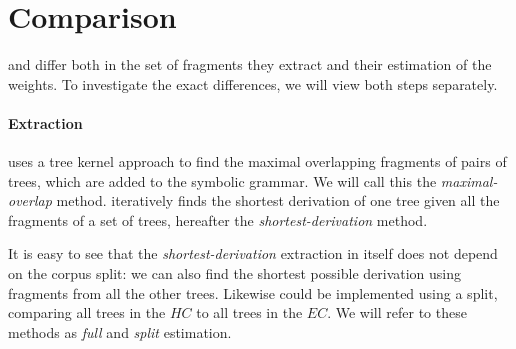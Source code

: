 
\section{Comparison} \label{sec:Comparison}
\dops{} and \ddop{} differ both in the set of fragments they extract and their estimation of the weights. To investigate the exact differences, we will view both steps separately.


\paragraph{Extraction}
\ddop{} uses a tree kernel approach to find the maximal overlapping fragments of pairs of trees, which are added to the symbolic grammar. We will call this the \emph{maximal-overlap} method. \dops{} iteratively finds the shortest derivation of one tree given all the fragments of a set of trees, hereafter the \emph{shortest-derivation} method. 

It is easy to see that the \emph{shortest-derivation} extraction in itself does not depend on the corpus split: we can also find the shortest possible derivation using fragments from all the other trees. Likewise \ddop{} could be implemented using a split, comparing all trees in the $HC$ to all trees in the $EC$.
We will refer to these methods as \emph{full} and \emph{split} estimation.



